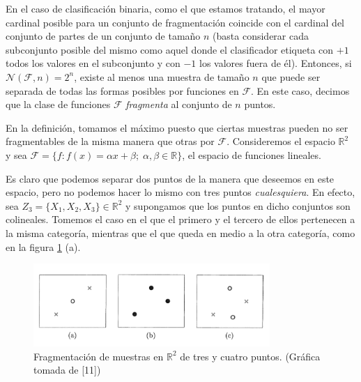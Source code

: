 \documentclass{report}
\begin{document}
En el caso de clasificación binaria, como el que estamos tratando, el mayor cardinal posible para un conjunto de fragmentación
coincide con el cardinal del conjunto de partes de un conjunto de tamaño $n$ (basta considerar cada subconjunto posible del mismo
como aquel donde el clasificador etiqueta con $+1$ todos los valores en el subconjunto y con $-1$ los valores fuera de él). Entonces,
si \(\mathcal{N}(\mathcal{F}, n) = 2^n\), existe al menos una muestra de tamaño \(n\) que puede ser separada 
de todas las formas posibles por funciones en \(\mathcal{F}\). En este caso, decimos que la clase de funciones 
\(\mathcal{F}\) \textit{fragmenta} al conjunto de \(n\) puntos.\newline

En la definición, tomamos el máximo puesto que ciertas muestras pueden no ser fragmentables de la misma manera que otras por \(\mathcal{F}\). 
Consideremos el espacio $\mathbb{R}^2$ y sea $\mathcal{F}=\{f: f(x)= \alpha x + \beta; \; \alpha, \beta\in\mathbb{R}\}$, el espacio
de funciones lineales.\newline

Es claro que podemos separar dos puntos de la manera que deseemos en este espacio, pero no podemos hacer lo mismo con tres puntos \textit{cualesquiera}.
En efecto, sea $Z_3 = \{X_1,X_2,X_3\} \in \mathbb{R}^2$ y supongamos que los puntos en dicho conjuntos son colineales. Tomemos el caso en el que el primero y el tercero de ellos pertenecen a la misma categoría,
mientras que el que queda en medio a la otra categoría, como en la figura \ref{fragmentacion perceptron} (a).\newline 

\begin{figure}[ht]
    \centering
    \includegraphics[width=0.8\textwidth]{Images/5.png}
    
    \caption{Fragmentación de muestras en $\mathbb{R}^2$ de tres y cuatro puntos. (Gráfica tomada de [11])}
    \label{fragmentacion perceptron}
    \end{figure}
\end{document}
